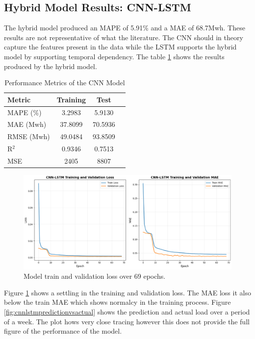 \subsection{Hybrid Model Results: CNN-LSTM}
 The hybrid model produced an MAPE of 5.91\% and a MAE of 68.7Mwh. These results are not representative of what the literature. The CNN should in theory capture the features present in the data while the LSTM supports the hybrid model by supporting temporal dependency. The table \ref{tab:cnn-lstm-results} shows the results produced by the hybrid model.
  \begin{table}[h]
 	\centering
 	\caption{Performance Metrics of the CNN Model}
 	\label{tab:cnn-lstm-results}
 	\begin{tabular}{lccc}
 		\hline
 		\textbf{Metric} & \textbf{Training} & \textbf{Test} \\
 		\hline
 		MAPE (\%) & 3.2983 & 5.9130 \\
 		MAE (Mwh) & 37.8099 &  70.5936  \\
 		RMSE (Mwh) & 49.0484 &  93.8509  \\
 		R$^2$ & 0.9346 & 0.7513  \\
 		MSE & 2405 & 8807  \\
 		\hline
 	\end{tabular}
 \end{table}
 \begin{figure}[h]
 	\centering
 	\includegraphics[width=0.9\linewidth,height=0.3\textwidth]{Chapters/images/results/CNN-LSTM-MODEL-LOSS}
 	\caption{Model train and validation loss over 69 epochs.}
 	\label{fig:cnn-lstm-model-loss}
 \end{figure}
 Figure \ref{fig:cnn-lstm-model-loss} shows a settling in the training and validation loss. The MAE loss it also below the train MAE which shows normalcy in the training process. Figure \ref{fig:cnnlstmpredictionvsactual} shows the prediction and actual load over a period of a week. The plot hows very close tracing however this does not provide the full figure of the performance of the model.
